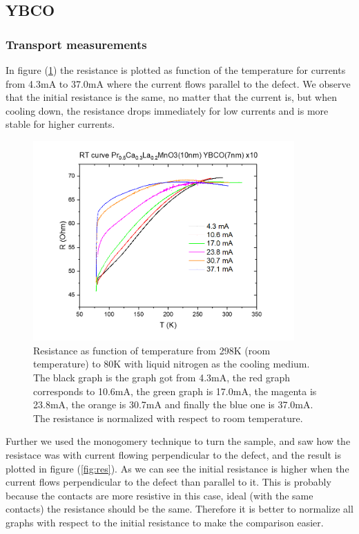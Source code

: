 \documentclass{comjnl}
\begin{document}
\subsection{YBCO}
\subsubsection{Transport measurements}
In figure (\ref{fig:res_norm}) the resistance is plotted as function of the temperature for currents from 4.3mA to 37.0mA where the current flows parallel to the defect. We observe that the initial resistance is the same, no matter that the current is, but when cooling down, the resistance drops immediately for low currents and is more stable for higher currents. 
\begin{figure}[h]
\centering
\includegraphics[width=100mm]{Bilde1.png}
\caption{Resistance as function of temperature from 298K (room temperature) to 80K with liquid nitrogen as the cooling medium. The black graph is the graph got from 4.3mA, the red graph corresponds to 10.6mA, the green graph is 17.0mA, the magenta is 23.8mA, the orange is 30.7mA and finally the blue one is 37.0mA. The resistance is normalized with respect to room temperature. \label{fig:res_norm}}
\end{figure}
Further we used the monogomery technique to turn the sample, and saw how the resistace was with current flowing perpendicular to the defect, and the result is plotted in figure (\ref{fig:res}). As we can see the initial resistance is higher when the current flows perpendicular to the defect than parallel to it. This is probably because the contacts are more resistive in this case, ideal (with the same contacts) the resistance should be the same. Therefore it is better to normalize all graphs with respect to the initial resistance to make the comparison easier. 
\end{document}
